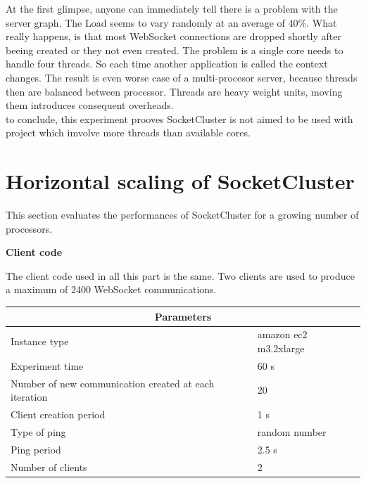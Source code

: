 At the first glimpse, anyone can immediately tell there is a problem with the server
graph. The Load seems to vary randomly at an average of 40\%. What really happens, is
that most WebSocket connections are dropped shortly after beeing created or they 
not even created. The problem is a single core needs to handle four threads. So each
time another application is called the context changes. The result is even worse case of 
a multi-procesor server, because threads then are balanced between processor. Threads 
are heavy weight units, moving them introduces consequent overheads.\\

to conclude, this experiment prooves SocketCluster is not aimed to be used with
project which imvolve more threads than available cores.\\


\section{Horizontal scaling of SocketCluster }

This section evaluates the performances of SocketCluster for a growing number
of processors. 

\textbf{Client code}

The client code used in all this part is the same. Two clients are used to
produce a maximum of 2400 WebSocket communications.


\begin{center}
  \begin{tabular}{ | l | l |}
  \hline
  \multicolumn{2}{|c|}{Parameters} \\
  \hline
    Instance type &  amazon ec2 m3.2xlarge\\ 
    Experiment time & 60 s \\
    Number of new communication created at each iteration & 20 \\
    Client creation period & 1 s \\
    Type of ping & random number \\ 
    Ping period & 2.5 s \\ 
    Number of clients & 2 \\
  \hline
  \end{tabular}
\end{center}


